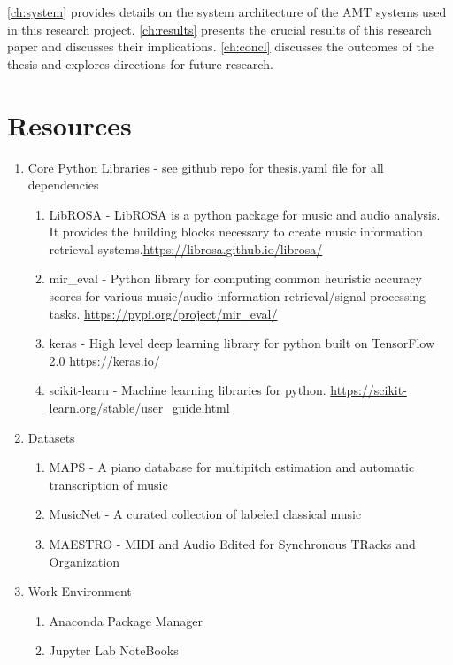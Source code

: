 \autoref{ch:system} provides details on the system architecture of the AMT
systems used in this research project. \autoref{ch:results} presents the crucial
results of this research paper and discusses their implications.
\autoref{ch:concl} discusses the outcomes of the thesis and explores directions
for future research.

\section{Resources}

\begin{enumerate}
      \item Core Python Libraries - see
            \href{https://github.com/OliverIgnetik/engn4200_thesis}{github repo}
            for thesis.yaml file for all dependencies
            \begin{enumerate}
                  \item LibROSA - LibROSA is a python package for music and audio analysis. It provides the building blocks necessary to create music information retrieval systems.\newline \url{https://librosa.github.io/librosa/}
                  \item mir\_eval -  Python library for computing common heuristic accuracy scores for various music/audio information retrieval/signal processing tasks. \newline \url{https://pypi.org/project/mir_eval/}
                  \item keras - High level deep learning library for python built on TensorFlow 2.0 \newline \url{https://keras.io/}
                  \item scikit-learn -  Machine learning libraries for python. \newline \url{https://scikit-learn.org/stable/user_guide.html}
            \end{enumerate}
      \item Datasets
            \begin{enumerate}
                  \item MAPS - A piano database for multipitch estimation and automatic
                        transcription of music \cite{MAPS:Emiya}
                  \item MusicNet - A curated collection of labeled classical music \cite{thickstun2018invariances}
                  \item MAESTRO - MIDI and Audio Edited for Synchronous TRacks and
                        Organization \cite{hawthorne2018enabling}
            \end{enumerate}

      \item Work Environment
            \begin{enumerate}
                  \item Anaconda Package Manager
                  \item Jupyter Lab NoteBooks
            \end{enumerate}
\end{enumerate}
